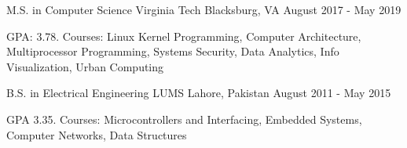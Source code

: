 

\begin{cventries}

  \cventry
    {M.S. in Computer Science} %
    {Virginia Tech} %
    {Blacksburg, VA} %
    {August 2017 - May 2019} %
    {
      \begin{cvitems} %
      GPA: 3.78. Courses: Linux Kernel Programming, Computer Architecture, Multiprocessor Programming, Systems Security, Data Analytics, Info Visualization, Urban Computing
      \end{cvitems}
    }
  \cventry
    {B.S. in Electrical Engineering} %
    {LUMS} %
    {Lahore, Pakistan} %
    {August 2011 - May 2015} %
    {
      \begin{cvitems} %
      GPA 3.35. Courses: Microcontrollers and Interfacing, Embedded Systems, Computer Networks, Data Structures
      \end{cvitems}
    }
\end{cventries}
